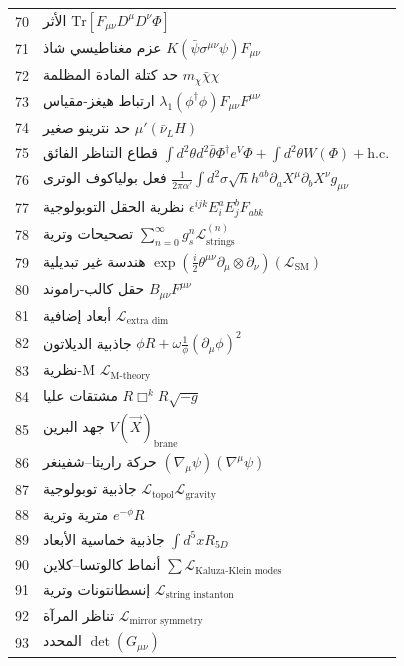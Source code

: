 \documentclass[11pt,a4paper]{article}
\begin{document}
\begin{longtable}{r l}
		70 & الأثر \(\mathrm{Tr}[F_{\mu\nu}D^\mu D^\nu\Phi]\) \\
		71 & عزم مغناطيسي شاذ \(K(\bar{\psi}\sigma^{\mu\nu}\psi)F_{\mu\nu}\) \\
		72 & حد كتلة المادة المظلمة \(m_\chi\bar{\chi}\chi\) \\
		73 & ارتباط هيغز-مقياس \(\lambda_1(\phi^\dagger\phi)F_{\mu\nu}F^{\mu\nu}\) \\
		74 & حد نترينو صغير \(\mu'(\bar{\nu}_L H)\) \\
		75 & قطاع التناظر الفائق \(\int d^2\theta d^2\bar{\theta}\Phi^\dagger e^V\Phi + \int d^2\theta W(\Phi) + \text{h.c.}\) \\
		76 & فعل بولياكوف الوترى \(\frac{1}{2\pi\alpha'}\int d^2\sigma\sqrt{h}h^{ab}\partial_a X^\mu\partial_b X^\nu g_{\mu\nu}\) \\
		77 & نظرية الحقل التوبولوجية \(\epsilon^{ijk}E_i^a E_j^b F_{ab k}\) \\
		78 & تصحيحات وترية \(\sum_{n=0}^\infty g_s^n \mathcal{L}^{(n)}_{\text{strings}}\) \\
		79 & هندسة غير تبديلية \(\exp\left(\frac{i}{2}\theta^{\mu\nu}\partial_\mu\otimes\partial_\nu\right)(\mathcal{L}_{\text{SM}})\) \\
		80 & حقل كالب-راموند \(B_{\mu\nu}F^{\mu\nu}\) \\
		81 & أبعاد إضافية \(\mathcal{L}_{\text{extra dim}}\) \\
		82 & جاذبية الديلاتون \(\phi R + \omega\frac{1}{\phi}(\partial_\mu\phi)^2\) \\
		83 & نظرية-M \(\mathcal{L}_{\text{M‑theory}}\) \\
		84 & مشتقات عليا \(R\Box^k R\sqrt{-g}\) \\
		85 & جهد البرين \(V(\vec{X})_{\text{brane}}\) \\
		86 & حركة راريتا–شفينغر \((\nabla_\mu\psi)(\nabla^\mu\psi)\) \\
		87 & جاذبية توبولوجية \(\mathcal{L}_{\text{topol}}\mathcal{L}_{\text{gravity}}\) \\
		88 & مترية وترية \(e^{-\phi}R\) \\
		89 & جاذبية خماسية الأبعاد \(\int d^5x R_{5D}\) \\
		90 & أنماط كالوتسا–كلاين \(\sum\mathcal{L}_{\text{Kaluza‑Klein modes}}\) \\
		91 & إنسطانتونات وترية \(\mathcal{L}_{\text{string instanton}}\) \\
		92 & تناظر المرآة \(\mathcal{L}_{\text{mirror symmetry}}\) \\
		93 & المحدد \(\det(G_{\mu\nu})\) \\

\end{longtable}
\end{document}
